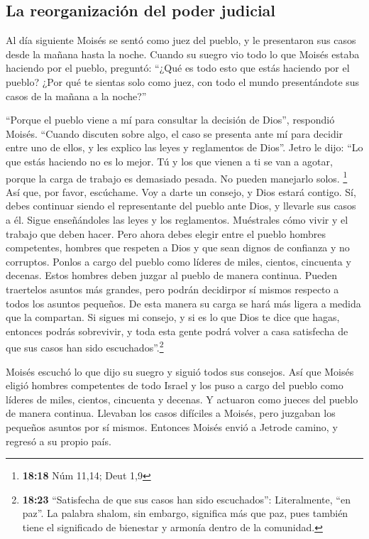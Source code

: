 \hypertarget{la-reorganizaciuxf3n-del-poder-judicial}{%
\subsection{La reorganización del poder
judicial}\label{la-reorganizaciuxf3n-del-poder-judicial}}

 Al día siguiente Moisés se sentó como juez del pueblo, y
le presentaron sus casos desde la mañana hasta la noche. 
Cuando su suegro vio todo lo que Moisés estaba haciendo por el pueblo,
preguntó: ``¿Qué es todo esto que estás haciendo por el pueblo? ¿Por qué
te sientas solo como juez, con todo el mundo presentándote sus casos de
la mañana a la noche?''

 ``Porque el pueblo viene a mí para consultar la decisión
de Dios'', respondió Moisés.  ``Cuando discuten sobre
algo, el caso se presenta ante mí para decidir entre uno de ellos, y les
explico las leyes y reglamentos de Dios''.  Jetro le
dijo: ``Lo que estás haciendo no es lo mejor.  Tú y los
que vienen a ti se van a agotar, porque la carga de trabajo es demasiado
pesada. No pueden manejarlo solos. \footnote{\textbf{18:18} Núm 11,14;
  Deut 1,9}  Así que, por favor, escúchame. Voy a darte
un consejo, y Dios estará contigo. Sí, debes continuar siendo el
representante del pueblo ante Dios, y llevarle sus casos a él.
 Sigue enseñándoles las leyes y los reglamentos.
Muéstrales cómo vivir y el trabajo que deben hacer.  Pero
ahora debes elegir entre el pueblo hombres competentes, hombres que
respeten a Dios y que sean dignos de confianza y no corruptos. Ponlos a
cargo del pueblo como líderes de miles, cientos, cincuenta y decenas.
 Estos hombres deben juzgar al pueblo de manera continua.
Pueden traertelos asuntos más grandes, pero podrán decidirpor sí mismos
respecto a todos los asuntos pequeños. De esta manera su carga se hará
más ligera a medida que la compartan.  Si sigues mi
consejo, y si es lo que Dios te dice que hagas, entonces podrás
sobrevivir, y toda esta gente podrá volver a casa satisfecha de que sus
casos han sido escuchados''.\footnote{\textbf{18:23} ``Satisfecha de que
  sus casos han sido escuchados'': Literalmente, ``en paz''. La palabra
  shalom, sin embargo, significa más que paz, pues también tiene el
  significado de bienestar y armonía dentro de la comunidad.}

 Moisés escuchó lo que dijo su suegro y siguió todos sus
consejos.  Así que Moisés eligió hombres competentes de
todo Israel y los puso a cargo del pueblo como líderes de miles,
cientos, cincuenta y decenas.  Y actuaron como jueces del
pueblo de manera continua. Llevaban los casos difíciles a Moisés, pero
juzgaban los pequeños asuntos por sí mismos.  Entonces
Moisés envió a Jetrode camino, y regresó a su propio país.

